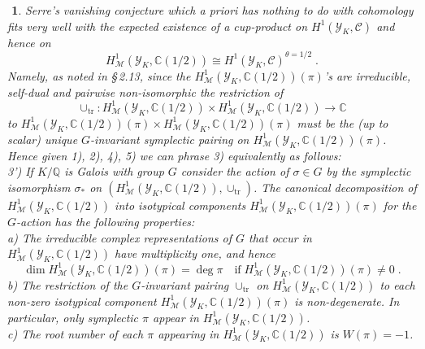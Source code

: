 \documentclass[12pt,leqno]{article}
\newcommand{\C}{{\mathbb{C}}}
\newcommand{\Q}{{\mathbb{Q}}}
\newcommand{\tr}{\mathrm{tr}}
\newcommand{\Ch}{{\mathcal C}}
\newcommand{\Mh}{{\mathcal M}}
\newcommand{\Yh}{\mathcal{Y}}
\newtheorem{punkt}[theorem]{$\!\!$}
\begin{document}
\begin{punkt} \label{t2.16} \em
Serre's vanishing conjecture which a priori has nothing to do with cohomology fits very well with the expected existence of a cup-product on $H^1 (\Yh_K , \Ch)$ and hence on 
\[
H^1_{\Mh} (\Yh_K , \C (1/2)) \cong H^1 (\Yh_K , \Ch)^{\theta = 1/2} \; .
\]
Namely, as noted in \cite{D2} \S\,2.13, since the $H^1_{\Mh} (\Yh_K , \C (1/2)) (\pi)$'s are irreducible, self-dual and pairwise non-isomorphic the restriction of 
\[
\cup_{\tr} : H^1_{\Mh} (\Yh_K , \C (1/2)) \times H^1_{\Mh} (\Yh_K , \C (1/2)) \to \C
\]
to $H^1_{\Mh} (\Yh_K , \C (1/2)) (\pi) \times H^1_{\Mh} (\Yh_K , \C (1/2)) (\pi)$ must be the (up to scalar) unique $G$-invariant symplectic pairing on $H^1_{\Mh} (\Yh_K , \C (1/2)) (\pi)$. Hence given 1), 2), 4), 5) we can phrase 3) equivalently as follows:\\
3') If $K / \Q$ is Galois with group $G$ consider the action of $\sigma \in G$ by the symplectic isomorphism $\sigma_*$ on $(H^1_{\Mh} (\Yh_K , \C (1/2)) , \cup_{\tr})$. The canonical decomposition of $H^1_{\Mh} (\Yh_K , \C (1/2))$ into isotypical components $H^1_{\Mh} (\Yh_K , \C (1/2)) (\pi)$ for the $G$-action has the following properties:\\
a) The irreducible complex representations of $G$ that occur in $H^1_{\Mh} (\Yh_K , \C (1/2))$ have multiplicity one, and hence
\[
\dim H^1_{\Mh} (\Yh_K , \C (1/2)) (\pi) = \deg \pi \quad \text{if} \; H^1_{\Mh} (\Yh_K , \C (1/2)) (\pi) \neq 0 \; .
\]
b) The restriction of the $G$-invariant pairing $\cup_{\tr}$ on $H^1_{\Mh} (\Yh_K , \C (1/2))$ to each non-zero isotypical component $H^1_{\Mh} (\Yh_K , \C (1/2)) (\pi)$ is non-degenerate. In particular, only symplectic $\pi$ appear in $H^1_{\Mh} (\Yh_K , \C (1/2))$.\\
c) The root number of each $\pi$ appearing in $H^1_{\Mh} (\Yh_K , \C (1/2))$ is $W (\pi) = -1$. 
\end{punkt}
\end{document}

